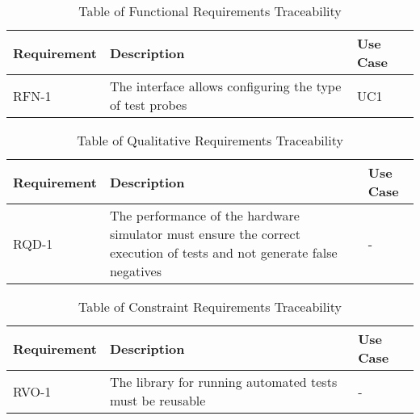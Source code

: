 \newpage

\begin{table}%
\caption{Table of Functional Requirements Traceability}
\label{tab:functional-requirements}
\begin{tabularx}{\textwidth}{lXl}
\hline\hline
\textbf{Requirement} & \textbf{Description} & \textbf{Use Case}\\
\hline
RFN-1     & The interface allows configuring the type of test probes & UC1 \\
\hline
\end{tabularx}
\end{table}%

\begin{table}%
\caption{Table of Qualitative Requirements Traceability}
\label{tab:qualitative-requirements}
\begin{tabularx}{\textwidth}{lXl}
\hline\hline
\textbf{Requirement} & \textbf{Description} & \textbf{Use Case}\\
\hline
RQD-1    & The performance of the hardware simulator must ensure the correct execution of tests and not generate false negatives & - \\
\hline
\end{tabularx}
\end{table}%

\begin{table}%
\caption{Table of Constraint Requirements Traceability}
\label{tab:constraint-requirements}
\begin{tabularx}{\textwidth}{lXl}
\hline\hline
\textbf{Requirement} & \textbf{Description} & \textbf{Use Case}\\
\hline
RVO-1    & The library for running automated tests must be reusable & - \\
\hline
\end{tabularx}
\end{table}%